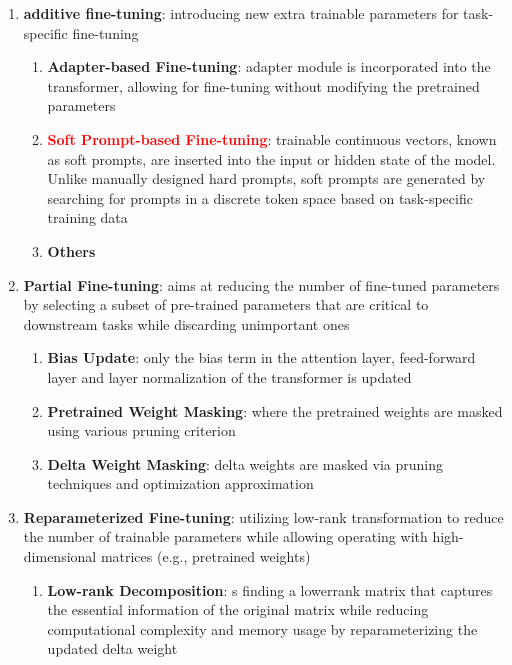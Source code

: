 \begin{enumerate}
    \item \textbf{additive fine-tuning}: introducing new extra trainable parameters for task-specific fine-tuning
    \begin{enumerate}
        \item \textbf{Adapter-based Fine-tuning}: adapter module is incorporated into the transformer, allowing for fine-tuning without modifying the pretrained parameters 
        \item \textbf{\textcolor{red}{Soft Prompt-based Fine-tuning}}: trainable continuous vectors, known as soft prompts, are inserted into the input or hidden state of the model. Unlike manually designed hard prompts, soft prompts are generated by searching for prompts in a discrete token space based on task-specific training data 
        \item \textbf{Others} 
    \end{enumerate}
    \item \textbf{Partial Fine-tuning}: aims at reducing the number of fine-tuned parameters by selecting a subset of pre-trained parameters that are critical to downstream tasks while discarding unimportant ones
    \begin{enumerate}
        \item \textbf{Bias Update}: only the bias term in the attention layer, feed-forward layer and layer normalization of the transformer is updated
        \item \textbf{Pretrained Weight Masking}: where the pretrained weights are masked using various pruning criterion
        \item \textbf{Delta Weight Masking}: delta weights are masked via pruning techniques and optimization approximation
    \end{enumerate}
    \item \textbf{Reparameterized Fine-tuning}: utilizing low-rank transformation to reduce the number of trainable parameters while allowing operating with high-dimensional matrices (e.g., pretrained weights)
    \begin{enumerate}
        \item \textbf{Low-rank Decomposition}: s finding a lowerrank matrix that captures the essential information of the original matrix while reducing computational complexity and memory usage by reparameterizing the updated delta weight

\end{enumerate}
\end{enumerate}
